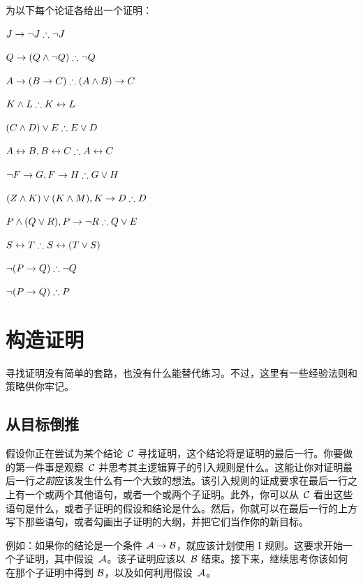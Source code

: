 \solutions
\problempart
\label{pr.solvedTFLproofs}
为以下每个论证各给出一个证明：


\begin{compactlist}
\item $J\eif\enot J \therefore \enot J$
\item $Q\eif(Q\eand\enot Q) \therefore \enot Q$
\item $A\eif (B\eif C) \therefore (A\eand B)\eif C$
\item $K\eand L \therefore K\eiff L$
\item $(C\eand D)\eor E \therefore E\eor D$
\item $A\eiff B, B\eiff C \therefore A\eiff C$
\item $\enot F\eif G, F\eif H \therefore G\eor H$
\item $(Z\eand K) \eor (K\eand M), K \eif D \therefore D$
\item $P \eand (Q\eor R), P\eif \enot R \therefore Q\eor E$
\item $S\eiff T \therefore S\eiff (T\eor S)$
\item $\enot (P \eif Q) \therefore \enot Q$
\item $\enot (P \eif Q) \therefore P$
\end{compactlist}

\chapter{构造证明}\label{s:stratTFL}

寻找证明没有简单的套路，也没有什么能替代练习。不过，这里有一些经验法则和策略供你牢记。

\section{从目标倒推}

假设你正在尝试为某个结论~$\mathcal{C}$ 寻找证明，这个结论将是证明的最后一行。你要做的第一件事是观察~$\mathcal{C}$ 并思考其主逻辑算子的引入规则是什么。这能让你对证明最后一行\emph{之前}应该发生什么有一个大致的想法。该引入规则的证成要求在最后一行之上有一个或两个其他语句，或者一个或两个子证明。此外，你可以从~$\mathcal{C}$ 看出这些语句是什么，或者子证明的假设和结论是什么。然后，你就可以在最后一行的上方写下那些语句，或者勾画出子证明的大纲，并把它们当作你的新目标。

例如：如果你的结论是一个条件 $\mathcal{A}\rightarrow\mathcal{B}$，就应该计划使用 {\eif}I 规则。这要求开始一个子证明，其中假设~$\mathcal{A}$。该子证明应该以~$\mathcal{B}$ 结束。接下来，继续思考你该如何在那个子证明中得到 $\mathcal{B}$，以及如何利用假设~$\mathcal{A}$。

